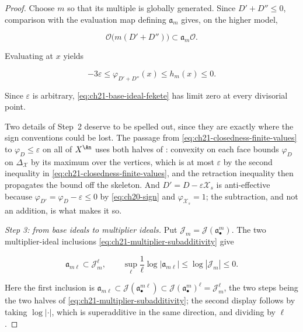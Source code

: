 \begin{proof}
Choose $m$ so that its multiple is globally generated.  Since
$D'+D''\leq0$, comparison with the evaluation map defining
$\mathfrak a_m$ gives, on the higher model,

\[
       \mathcal O\bigl(m(D'+D'')\bigr)
       \subset \mathfrak a_m\mathcal O.
\]

Evaluating at $x$ yields

\begin{equation}
\label{eq:ch21-closedness-base-bound}
             -3\varepsilon
             \leq\varphi_{D'+D''}(x)
             \leq h_m(x)\leq0.
\end{equation}

Since $\varepsilon$ is arbitrary,
\eqref{eq:ch21-base-ideal-fekete} has limit zero at every divisorial point.

Two details of Step~2 deserve to be spelled out, since they are exactly
where the sign conventions could be lost.  The passage from
\eqref{eq:ch21-closedness-finite-values} to $\varphi_D\leq\varepsilon$
on all of $X^{\An}$ uses both halves of
: convexity on each face bounds
$\varphi_D$ on $\Delta_{\mathcal X}$ by its maximum over the vertices,
which is at most $\varepsilon$ by the second inequality in
\eqref{eq:ch21-closedness-finite-values}, and the retraction inequality then
propagates the bound off the skeleton.  And $D'=D-\varepsilon\mathcal X_s$
is anti-effective because $\varphi_{D'}=\varphi_D-\varepsilon\leq0$ by
\eqref{eq:ch20-sign} and $\varphi_{\mathcal X_s}=1$; the subtraction, and
not an addition, is what makes it so.

\emph{Step 3: from base ideals to multiplier ideals.}
Put $\mathcal J_m=\mathcal J(\mathfrak a_\bullet^m)$.  The two
multiplier-ideal inclusions
\eqref{eq:ch21-multiplier-subadditivity} give

\begin{equation}
\label{eq:ch21-closedness-multiplier-bound}
       \mathfrak a_{m\ell}\subset\mathcal J_m^\ell,
       \qquad
       \sup_{\ell}\frac1\ell\log|\mathfrak a_{m\ell}|
       \leq\log|\mathcal J_m|\leq0.
\end{equation}

Here the first inclusion is
$\mathfrak a_{m\ell}\subset\mathcal J(\mathfrak a_\bullet^{m\ell})\subset
\mathcal J(\mathfrak a_\bullet^{m})^{\ell}=\mathcal J_m^\ell$, the two
steps being the two halves of
\eqref{eq:ch21-multiplier-subadditivity}; the second display follows by
taking $\log|\cdot|$, which is superadditive in the same direction, and
dividing by $\ell$.


\end{proof}
